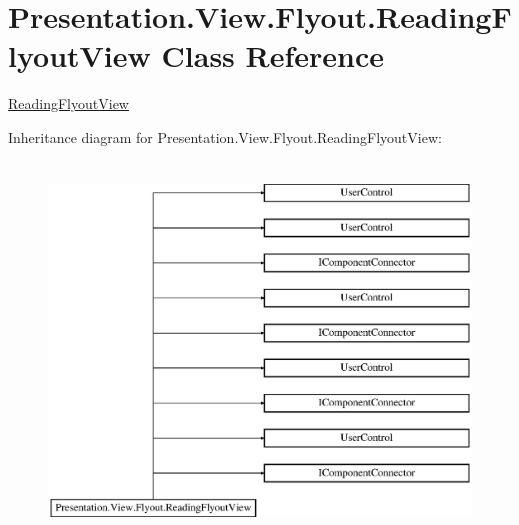 \hypertarget{class_presentation_1_1_view_1_1_flyout_1_1_reading_flyout_view}{}\section{Presentation.\+View.\+Flyout.\+Reading\+Flyout\+View Class Reference}
\label{class_presentation_1_1_view_1_1_flyout_1_1_reading_flyout_view}


\hyperlink{class_presentation_1_1_view_1_1_flyout_1_1_reading_flyout_view}{Reading\+Flyout\+View}  


Inheritance diagram for Presentation.\+View.\+Flyout.\+Reading\+Flyout\+View\+:\begin{figure}[H]
\begin{center}
\leavevmode
\includegraphics[height=10.000000cm]{class_presentation_1_1_view_1_1_flyout_1_1_reading_flyout_view}
\end{center}
\end{figure}
